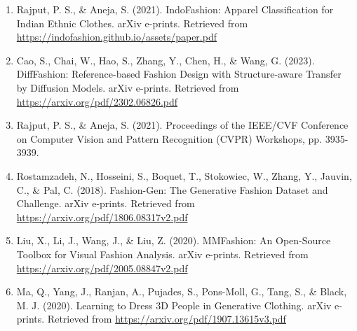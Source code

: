 \documentclass{article}
\begin{document}
\begin{enumerate}
    \item Rajput, P. S., \& Aneja, S. (2021). IndoFashion: Apparel Classification for Indian Ethnic Clothes. arXiv e-prints.
    Retrieved from \url{https://indofashion.github.io/assets/paper.pdf}
    
    \item Cao, S., Chai, W., Hao, S., Zhang, Y., Chen, H., \& Wang, G. (2023). DiffFashion: Reference-based Fashion Design with Structure-aware Transfer by Diffusion Models. arXiv e-prints. Retrieved from \url{https://arxiv.org/pdf/2302.06826.pdf}
    
    \item Rajput, P. S., \& Aneja, S. (2021). Proceedings of the IEEE/CVF Conference on Computer Vision and Pattern Recognition (CVPR) Workshops, pp. 3935-3939.
    
    \item Rostamzadeh, N., Hosseini, S., Boquet, T., Stokowiec, W., Zhang, Y., Jauvin, C., \& Pal, C. (2018). Fashion-Gen: The Generative Fashion Dataset and Challenge. arXiv e-prints. Retrieved from \url{https://arxiv.org/pdf/1806.08317v2.pdf}
    
    \item Liu, X., Li, J., Wang, J., \& Liu, Z. (2020). MMFashion: An Open-Source Toolbox for Visual Fashion Analysis. arXiv e-prints. Retrieved from \url{https://arxiv.org/pdf/2005.08847v2.pdf}
    
    \item Ma, Q., Yang, J., Ranjan, A., Pujades, S., Pons-Moll, G., Tang, S., \& Black, M. J. (2020). Learning to Dress 3D People in Generative Clothing. arXiv e-prints. Retrieved from \url{https://arxiv.org/pdf/1907.13615v3.pdf}
\end{enumerate}
\end{document}
